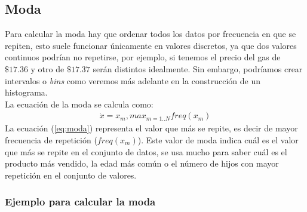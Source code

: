 \documentclass{article}
\begin{document}
\subsection{Moda}

Para calcular la moda hay que ordenar todos los datos por frecuencia en que se repiten, esto suele funcionar únicamente en valores discretos, ya que dos valores continuos podrían no repetirse, por ejemplo, si tenemos el precio del gas de $\$17.36$ y otro de $\$17.37$ serán distintos idealmente. Sin embargo, podríamos crear intervalos o \textit{bins} como veremos más adelante en la construcción de un histograma.
\\[12pt]
La ecuación de la moda se calcula como:
\begin{equation}
    \begin{aligned}
        \dot{x} = x_m, max_{m=1..N} freq(x_m)
    \end{aligned}
    \label{eq:moda}
\end{equation}
La ecuación (\ref{eq:moda}) representa el valor que más se repite, es decir de mayor frecuencia de repetición ($freq(x_m)$). Este valor de moda indica cuál es el valor que más se repite en el conjunto de datos, se usa mucho para saber cuál es el producto más vendido, la edad más común o el número de hijos con mayor repetición en el conjunto de valores.

\subsubsection{Ejemplo para calcular la moda}

\clearpage
\end{document}
